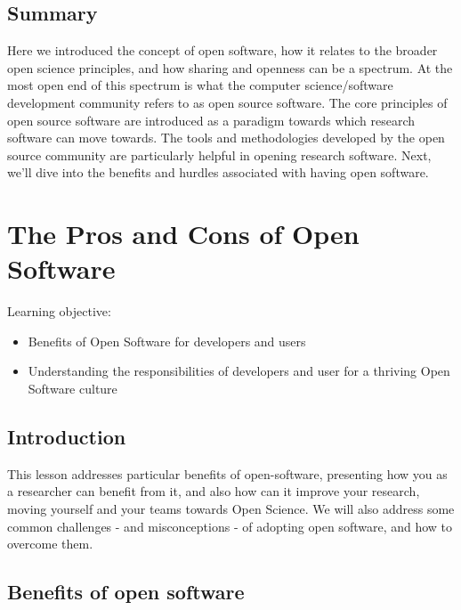\documentclass[
  letterpaper,
  DIV=11,
  numbers=noendperiod]{scrreport}
\providecommand{\tightlist}{%
  \setlength{\itemsep}{0pt}\setlength{\parskip}{0pt}}\usepackage{longtable,booktabs,array}
\begin{document}
\hypertarget{summary-3}{%
\section{Summary}\label{summary-3}}

Here we introduced the concept of open software, how it relates to the
broader open science principles, and how sharing and openness can be a
spectrum. At the most open end of this spectrum is what the computer
science/software development community refers to as open source
software. The core principles of open source software are introduced as
a paradigm towards which research software can move towards. The tools
and methodologies developed by the open source community are
particularly helpful in opening research software. Next, we'll dive into
the benefits and hurdles associated with having open software.

\hypertarget{the-pros-and-cons-of-open-software}{%
\chapter{The Pros and Cons of Open
Software}\label{the-pros-and-cons-of-open-software}}

Learning objective:

\begin{itemize}
\tightlist
\item
  Benefits of Open Software for developers and users
\item
  Understanding the responsibilities of developers and user for a
  thriving Open Software culture
\end{itemize}

\hypertarget{introduction-5}{%
\section{Introduction}\label{introduction-5}}

This lesson addresses particular benefits of open-software, presenting
how you as a researcher can benefit from it, and also how can it improve
your research, moving yourself and your teams towards Open Science. We
will also address some common challenges - and misconceptions - of
adopting open software, and how to overcome them.

\hypertarget{benefits-of-open-software}{%
\section{Benefits of open software}\label{benefits-of-open-software}}
\end{document}
